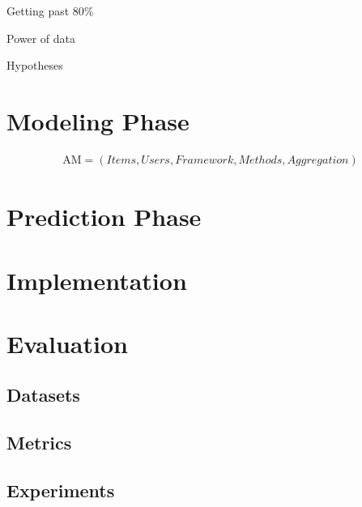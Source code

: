 Getting past 80\%

Power of data

Hypotheses

\section{Modeling Phase}

\begin{eqnarray}
  \mathrm{AM} = (Items, Users, Framework, Methods, Aggregation)
\end{eqnarray}


\section{Prediction Phase}

\section{Implementation}      

\section{Evaluation}   

\subsection{Datasets}

\subsection{Metrics}

\subsection{Experiments}


